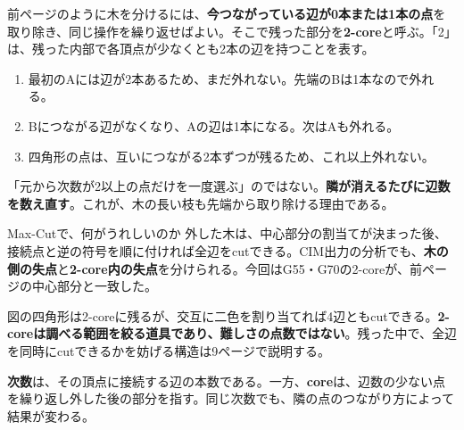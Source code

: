 \newpage
{}
前ページのように木を分けるには、\textbf{今つながっている辺が0本または1本の点}を取り除き、同じ操作を繰り返せばよい。そこで残った部分を\textbf{2-core}と呼ぶ。「2」は、残った内部で各頂点が少なくとも2本の辺を持つことを表す。

\begin{enumerate}
\item 最初のAには辺が2本あるため、まだ外れない。先端のBは1本なので外れる。
\item Bにつながる辺がなくなり、Aの辺は1本になる。次はAも外れる。
\item 四角形の点は、互いにつながる2本ずつが残るため、これ以上外れない。
\end{enumerate}
「元から次数が2以上の点だけを一度選ぶ」のではない。\textbf{隣が消えるたびに辺数を数え直す}。これが、木の長い枝も先端から取り除ける理由である。

\begin{point}{Max-Cutで、何がうれしいのか}
外した木は、中心部分の割当てが決まった後、接続点と逆の符号を順に付ければ全辺をcutできる。CIM出力の分析でも、\textbf{木の側の失点}と\textbf{2-core内の失点}を分けられる。今回はG55・G70の2-coreが、前ページの中心部分と一致した。
\end{point}

図の四角形は2-coreに残るが、交互に二色を割り当てれば4辺ともcutできる。\textbf{2-coreは調べる範囲を絞る道具であり、難しさの点数ではない}。残った中で、全辺を同時にcutできるかを妨げる構造は9ページで説明する。

\newpage
{}
\textbf{次数}は、その頂点に接続する辺の本数である。一方、\textbf{core}は、辺数の少ない点を繰り返し外した後の部分を指す。同じ次数でも、隣の点のつながり方によって結果が変わる。

